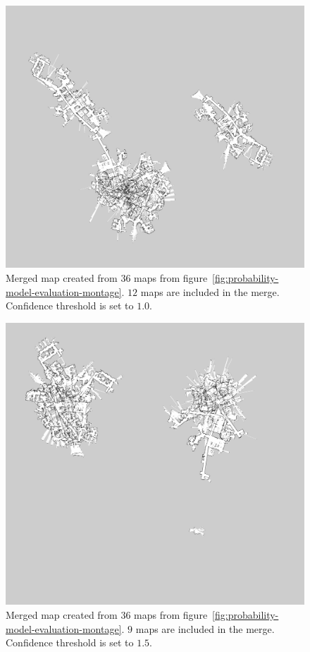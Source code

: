 \begin{figure}
    \centering
    \includegraphics[width=\textwidth]{../img/probability-model-evaluation-treshold_1_0-12maps.png}
    \caption{Merged map created from $36$ maps from figure~\ref{fig:probability-model-evaluation-montage}. $12$ maps are included in the merge. Confidence threshold is set to $1.0$.}
    \label{fig:probability-model-evaluation-treshold_1.0-12maps}
\end{figure}
\begin{figure}
    \centering
    \includegraphics[width=\textwidth]{../img/probability-model-evaluation-treshold_1_5-9maps.png}
    \caption{Merged map created from $36$ maps from figure~\ref{fig:probability-model-evaluation-montage}. $9$ maps are included in the merge. Confidence threshold is set to $1.5$.}
    \label{fig:probability-model-evaluation-treshold_1.5-9maps}
\end{figure}

